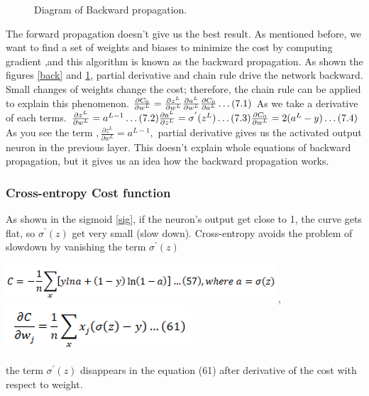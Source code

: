\documentclass{article}
\begin{document}
\begin{figure}[H]
\begin{minipage}[b]{0.3\textwidth}
    \caption{Diagram of Backward propagation.\protect\cite{BK}}
    \label{back2}
  \end{minipage}
\end{figure}

The forward propagation doesn’t give us the best result. As mentioned before, we want to find a set of weights and biases to minimize the cost by computing gradient ,and this algorithm is known as the backward propagation.
As shown the figures \ref{back} and \ref{back2}, partial derivative and chain rule drive the network backward.
Small changes of weights change the cost; therefore, the chain rule can be applied to explain this phenomenon.
$\frac{\partial C_0}{\partial w^L} = \frac{\partial z^L}{\partial w^L}\frac{\partial a^L}{\partial w^L}\frac{\partial C_0}{\partial a^L}\dots (7.1)\\$
As we take a derivative of each terms.
$\\ \frac{\partial z^L}{\partial w^L}=a^{L-1} \dots (7.2)
\\ \frac{\partial a^L}{\partial z^L}=\sigma^{'}(z^L) \dots (7.3)
\\ \frac{\partial C_0}{\partial w^L} = 2(a^L - y) \dots (7.4)$
\\As you see the term $,\frac{\partial z^L}{\partial w^L}=a^{L-1},$ partial derivative gives us the activated output neuron in the previous layer. This doesn't explain whole equations of backward propagation, but it gives us an idea how the backward propagation works.

\subsubsection{Cross-entropy Cost function}
As shown in the sigmoid \ref{sig}, if the neuron's output get close to 1, the curve gets flat, so $\sigma^{'}(z)$ get very small (slow down).
Cross-entropy avoids the problem of slowdown by vanishing the term $\sigma^{'}(z)$

\includegraphics[scale=0.8]{img/cross.png}, 
\includegraphics[scale=0.6]{img/cross1.png}

the term $\sigma^{'}(z)$ disappears in the equation (61) after derivative of the cost with respect to weight.
\end{document}
